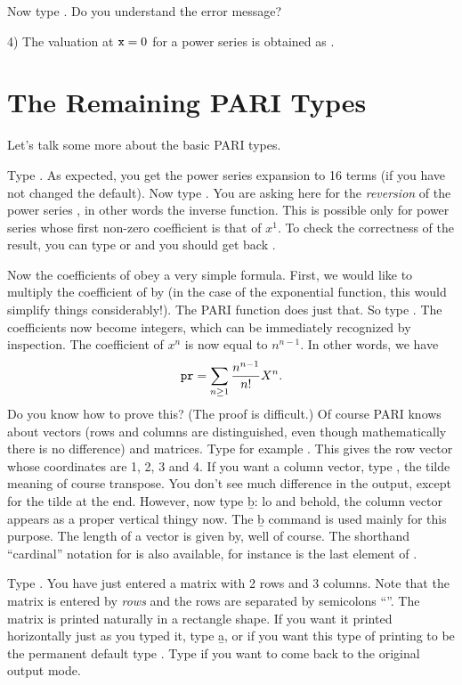 Now type . Do you understand the error message?

4) The valuation at ${\tt x} = 0$ for a power series  is obtained
as .

\section{The Remaining PARI Types}
Let's talk some more about the basic PARI types.

Type . As expected, you get the power series expansion
to 16 terms (if you have not changed the default). Now type
. You are asking here for the \emph{reversion} of the
power series , in other words the inverse function. This is possible
only for power series whose first non-zero coefficient is that of $x^1$.  To
check the correctness of the result, you can type  or
 and you should get back .

Now the coefficients of  obey a very simple formula. First, we would
like to multiply the coefficient of  by  (in the case of
the exponential function, this would simplify things considerably!). The PARI
function  does just that. So type .
The coefficients now become integers, which can be immediately recognized by
inspection. The coefficient of $x^n$ is now equal to
$n^{n-1}$. In other words, we have
%
$${\tt pr} = \sum_{n\ge1}{{n^{n-1}}\over{n!}} X^{n}.$$
%
Do you know how to prove this? (The proof is difficult.)
\smallskip
%
Of course PARI knows about vectors (rows and columns are distinguished, even
though mathematically there is no difference) and matrices. Type for example
\kbd{[1,2,3,4]}. This gives the row vector whose coordinates are 1, 2, 3 and
4.  If you want a column vector, type \kbd{[1,2,3,4]\til}, the tilde meaning
of course transpose. You don't see much difference in the output, except for
the tilde at the end. However, now type \b{b}: lo and behold, the column
vector appears as a proper vertical thingy now. The \b{b} command is used
mainly for this purpose. The length of a vector is given by, well
 of course. The shorthand ``cardinal'' notation  for
 is also available, for instance  is the last
element of .

Type . You have just entered a matrix with 2 rows and
3 columns. Note that the matrix is entered by \emph{rows} and the rows are
separated by semicolons ``\kbd{;}''. The matrix is printed naturally in a
rectangle shape. If you want it printed horizontally just as you typed it,
type \b{a}, or if you want this type of printing to be the permanent default
type . Type  if you want to
come back to the original output mode.

